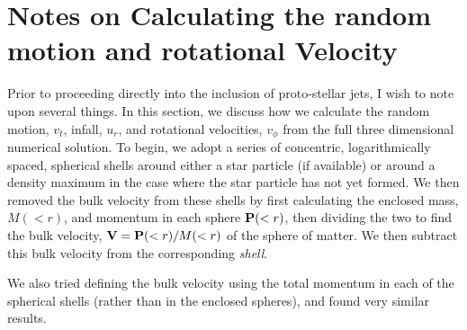 \documentclass[../dissertation.tex]{subfiles}
\begin{document}
%
%
%
%
%
\section{Notes on Calculating the random motion and rotational Velocity}
\label{Sec:Hydro_velocity}
Prior to proceeding directly into the inclusion of proto-stellar jets, I wish to note upon several things.
In this section, we discuss how we calculate the random motion, $v_t$, infall, $u_r$, and rotational velocities, $v_{\phi}$ from the full three dimensional numerical solution.  To begin, we adopt a series of concentric, logarithmically spaced, spherical shells around either a star particle (if available) or around a density maximum in the case where the star particle has not yet formed. We then removed the bulk velocity from these shells by first calculating the enclosed mass, $M(<r)$, and momentum in each sphere ${\bf P}(<r)$, then dividing the two to find the bulk velocity, ${\bf V} = {\bf P}(<r)/M(<r)$ of the sphere of matter. We then subtract this bulk velocity from the corresponding {\em shell}. 

We also tried defining the bulk velocity using the total momentum in each of the spherical shells (rather than in the enclosed spheres), and found very similar results.
\end{document}
